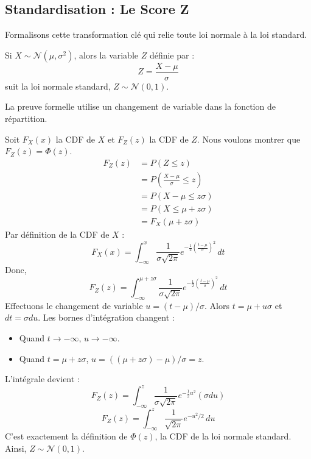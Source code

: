 \subsection{Standardisation : Le Score Z}

Formalisons cette transformation clé qui relie toute loi normale à la loi standard.

\begin{theorembox}
Si $X \sim \mathcal{N}(\mu, \sigma^2)$, alors la variable $Z$ définie par :
$$ Z = \frac{X - \mu}{\sigma} $$
suit la loi normale standard, $Z \sim \mathcal{N}(0, 1)$.
\end{theorembox}

La preuve formelle utilise un changement de variable dans la fonction de répartition.

\begin{proofbox}
Soit $F_X(x)$ la CDF de $X$ et $F_Z(z)$ la CDF de $Z$. Nous voulons montrer que $F_Z(z) = \Phi(z)$.
\begin{align*}
F_Z(z) &= P(Z \le z) \\
&= P\left( \frac{X-\mu}{\sigma} \le z \right) \\
&= P(X - \mu \le z\sigma) \\
&= P(X \le \mu + z\sigma) \\
&= F_X(\mu + z\sigma)
\end{align*}
Par définition de la CDF de $X$ :
$$ F_X(x) = \int_{-\infty}^x \frac{1}{\sigma \sqrt{2\pi}} e^{ -\frac{1}{2} \left( \frac{t-\mu}{\sigma} \right)^2 } \, dt $$
Donc,
$$ F_Z(z) = \int_{-\infty}^{\mu + z\sigma} \frac{1}{\sigma \sqrt{2\pi}} e^{ -\frac{1}{2} \left( \frac{t-\mu}{\sigma} \right)^2 } \, dt $$
Effectuons le changement de variable $u = (t-\mu)/\sigma$. Alors $t = \mu + u\sigma$ et $dt = \sigma du$.
Les bornes d'intégration changent :
\begin{itemize}
    \item Quand $t \to -\infty$, $u \to -\infty$.
    \item Quand $t = \mu + z\sigma$, $u = ((\mu + z\sigma)-\mu)/\sigma = z$.
\end{itemize}
L'intégrale devient :
$$ F_Z(z) = \int_{-\infty}^{z} \frac{1}{\sigma \sqrt{2\pi}} e^{ -\frac{1}{2} u^2 } (\sigma du) $$
$$ F_Z(z) = \int_{-\infty}^{z} \frac{1}{\sqrt{2\pi}} e^{ -u^2/2 } \, du $$
C'est exactement la définition de $\Phi(z)$, la CDF de la loi normale standard. Ainsi, $Z \sim \mathcal{N}(0, 1)$.
\end{proofbox}

